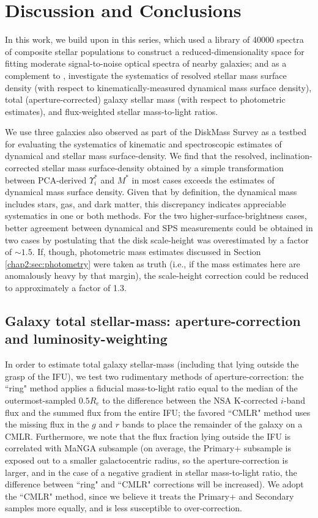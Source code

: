 \section{Discussion and Conclusions}
\label{chap2:sec:disc}

In this work, we build upon  in this series, which used a library of 40000 spectra of composite stellar populations to construct a reduced-dimensionality space for fitting moderate signal-to-noise optical spectra of nearby galaxies; and as a complement to , investigate the systematics of resolved stellar mass surface density (with respect to kinematically-measured dynamical mass surface density), total (aperture-corrected) galaxy stellar mass (with respect to photometric estimates), and flux-weighted stellar mass-to-light ratios.

We use three \mplv galaxies also observed as part of the DiskMass Survey \citep{diskmass_i} as a testbed for evaluating the systematics of kinematic and spectroscopic estimates of dynamical and stellar mass surface-density. We find that the resolved, inclination-corrected stellar mass surface-density obtained by a simple transformation between PCA-derived $\Upsilon^*_i$ and $M^*$ in most cases exceeds the estimates of dynamical mass surface density. Given that by definition, the dynamical mass includes stars, gas, and dark matter, this discrepancy indicates appreciable systematics in one or both methods. For the two higher-surface-brightness cases, better agreement between dynamical and SPS measurements could be obtained in two cases by postulating that the disk scale-height was overestimated by a factor of $\sim 1.5$. If, though, photometric mass estimates discussed in Section \ref{chap2:sec:photometry} were taken as truth (i.e., if the mass estimates here are anomalously heavy by that margin), the scale-height correction could be reduced to approximately a factor of 1.3.

\subsection{Galaxy total stellar-mass: aperture-correction and luminosity-weighting}

In order to estimate total galaxy stellar-mass (including that lying outside the grasp of the IFU), we test two rudimentary methods of aperture-correction: the ``ring" method applies a fiducial mass-to-light ratio equal to the median of the outermost-sampled $0.5 R_e$ to the difference between the NSA K-corrected $i$-band flux and the summed flux from the entire IFU; the favored ``CMLR" method uses the missing flux in the $g$ and $r$ bands to place the remainder of the galaxy on a CMLR. Furthermore, we note that the flux fraction lying outside the IFU is correlated with MaNGA subsample (on average, the Primary+ subsample is exposed out to a smaller galactocentric radius, so the aperture-correction is larger, and in the case of a negative gradient in stellar mass-to-light ratio, the difference between ``ring" and ``CMLR" corrections will be increased). We adopt the ``CMLR" method, since we believe it treats the Primary+ and Secondary samples more equally, and is less susceptible to over-correction.

